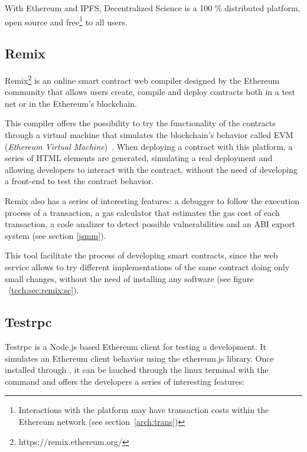 With Ethereum and IPFS, Decentralized Science is a 100 \% distributed platform,
open source and free\footnote{Interactions with the platform may have
  transaction costs within the Ethereum network (see section~\ref{arch:trans})
  \nopagebreak} to all users.


\subsection{Remix}
\label{sec:remix}

Remix\footnote{https://remix.ethereum.org/} is an online smart
contract web compiler designed by the Ethereum community that allows users
create, compile and deploy contracts both in a test net or in the Ethereum's
blockchain.

This compiler offers the possibility to try the functionality of the contracts
through a virtual machine that simulates the blockchain's behavior called EVM
(\emph{Ethereum Virtual Machine})~\cite{hildenbrandt2017kevm}. When deploying a
contract with this platform, a series of HTML elements are generated, simulating
a real deployment and allowing developers to interact with the contract, without
the need of developing a front-end to test the contract behavior.

Remix also has a series of interesting features: a debugger to follow the
execution process of a transaction, a gas calculator that estimates the gas cost
of each transaction, a code analizer to detect possible vulnerabilities and an
ABI export system (see section \ref{jsmm}).

This tool facilitate the process of developing smart contracts, since the web
service allows to try different implementations of the same contract doing only
small changes, without the need of installing any software (see figure
~\ref{tech:sec:remix:sc}).

\subsection{Testrpc}
\label{testrpc}


Testrpc is a Node.js based Ethereum client for testing a development. It
simulates an Ethereum client behavior using the ethereum.js library. Once
installed through , it can be lauched through the linux terminal with
the command  and offers the developers a series of interesting
features:

